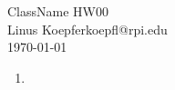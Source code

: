\documentclass[12pt]{article}
\begin{document}
\begin{center}
{\large ClassName HW00}\\
Linus Koepfer\qquad koepfl@rpi.edu\\
\today
\end{center}

\begin{enumerate}
	\item
\end{enumerate}
\end{document}
